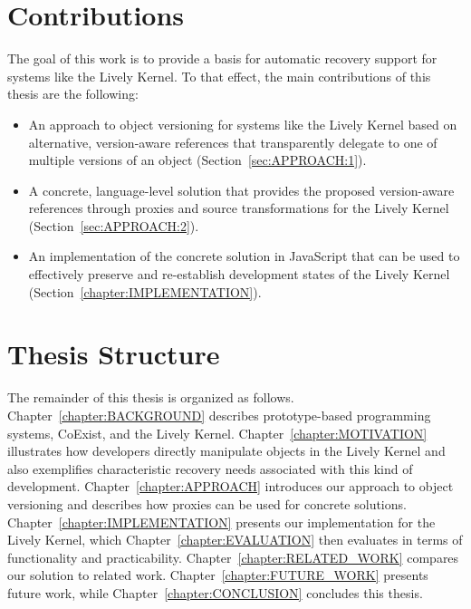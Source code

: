 \section{Contributions}

The goal of this work is to provide a basis for automatic recovery support for systems like the Lively Kernel.
To that effect, the main contributions of this thesis are the following:

\begin{itemize}
    \item An approach to object versioning for systems like the Lively Kernel based on alternative, version-aware references that transparently delegate to one of multiple versions of an object (Section~\ref{sec:APPROACH:1}).
    \item A concrete, language-level solution that provides the proposed version-aware references through proxies and source transformations for the Lively Kernel (Section~\ref{sec:APPROACH:2}).
    \item An implementation of the concrete solution in JavaScript that can be used to effectively preserve and re-establish development states of the Lively Kernel (Section~\ref{chapter:IMPLEMENTATION}).
\end{itemize}


\section{Thesis Structure}

The remainder of this thesis is organized as follows. 
Chapter~\ref{chapter:BACKGROUND} describes prototype-based programming systems, CoExist, and the Lively Kernel.
Chapter~\ref{chapter:MOTIVATION} illustrates how developers directly manipulate objects in the Lively Kernel and also exemplifies characteristic recovery needs associated with this kind of development.
Chapter~\ref{chapter:APPROACH} introduces our approach to object versioning and describes how proxies can be used for concrete solutions.
Chapter~\ref{chapter:IMPLEMENTATION} presents our implementation for the Lively Kernel, which Chapter~\ref{chapter:EVALUATION} then evaluates in terms of functionality and practicability.
Chapter~\ref{chapter:RELATED_WORK} compares our solution to related work.
Chapter~\ref{chapter:FUTURE_WORK} presents future work, while Chapter~\ref{chapter:CONCLUSION} concludes this thesis.
